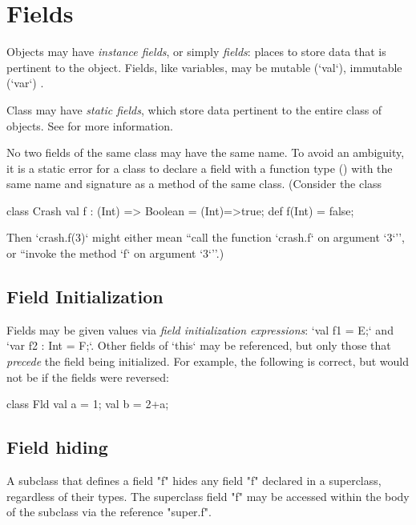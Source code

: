 \section{Fields}
\label{FieldDefinitions}

Objects may have {\em instance fields}, or simply {\em fields}: places to
store data that is pertinent to the object. Fields, like variables, may be
mutable (\xcd`val`), immutable (\xcd`var`)
.

Class may have {\em static fields}, which store data pertinent to the
entire class of objects.  
See  for more information.

No two fields of the same class may have the same name.
To avoid an ambiguity, it is a static error for a class to
declare a field with a function type () with
the same name and signature  as a method of the same class.  
(Consider the class 
\begin{xten}
class Crash {
  val f : (Int) => Boolean = (Int)=>true;
  def f(Int) = false;
}
\end{xten}
\noindent
Then \xcd`crash.f(3)` might either mean ``call the function \xcd`crash.f` on
argument \xcd`3`'', or ``invoke the method \xcd`f` on argument \xcd`3`''.)

\subsection{Field Initialization}

Fields may be given values via {\em field initialization expressions}:
\xcd`val f1 = E;` and \xcd`var f2 : Int = F;`. Other fields of \xcd`this` may
be referenced, but only those that {\em precede} the field being initialized.
For example, the following is correct, but would not be if the fields were
reversed:

\begin{xten}
class Fld{
  val a = 1;
  val b = 2+a;
}
\end{xten}
%


\subsection{Field hiding}

A subclass that defines a field \xcd"f" hides any field \xcd"f"
declared in a superclass, regardless of their types.  The
superclass field \xcd"f" may be accessed within the body of
the subclass via the reference \xcd"super.f".

